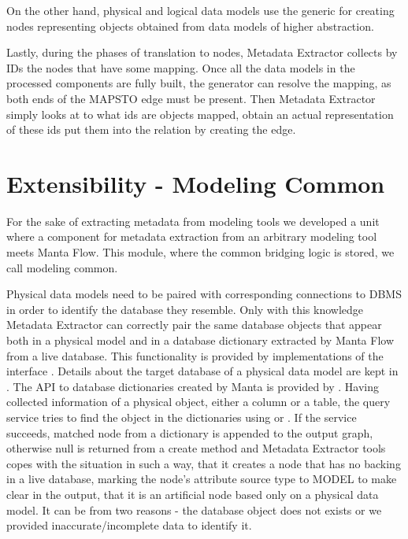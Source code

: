 On the other hand, physical and logical data models use the generic  for creating nodes representing objects obtained from data models of higher abstraction.

Lastly, during the phases of translation to nodes, Metadata Extractor collects by IDs the nodes that have some mapping.
Once all the data models in the processed components are fully built, the generator can resolve the mapping, as both ends of the MAPS\textunderscore TO edge must be present. 
Then Metadata Extractor simply looks at to what ids are objects mapped, obtain an actual representation of these ids put them into the relation by creating the edge.

\section{Extensibility - Modeling Common}
\label{modeling_common}

For the sake of extracting metadata from modeling tools we developed a unit where a component for metadata extraction from an arbitrary modeling tool meets Manta Flow.
This module, where the common bridging logic is stored, we call modeling common.

Physical data models need to be paired with corresponding connections to DBMS in order to identify the database they resemble. 
Only with this knowledge Metadata Extractor can correctly pair the same database objects that appear both in a physical model and in a database dictionary extracted by Manta Flow from a live database. 
This functionality is provided by implementations of the interface . Details about the target database of a physical data model are kept in . 
The API to database dictionaries created by Manta is provided by . 
Having collected information of a physical object, either a column or a table, the query service tries to find the object in the dictionaries using  or . 
If the service succeeds, matched node from a dictionary is appended to the output graph, otherwise null is returned from a create method and Metadata Extractor tools copes with the situation in such a way, that it creates a node that has no backing in a live database, marking the node's attribute source type to MODEL to make clear in the output, that it is an artificial node based only on a physical data model. 
It can be from two reasons - the database object does not exists or we provided inaccurate/incomplete data to identify it.

